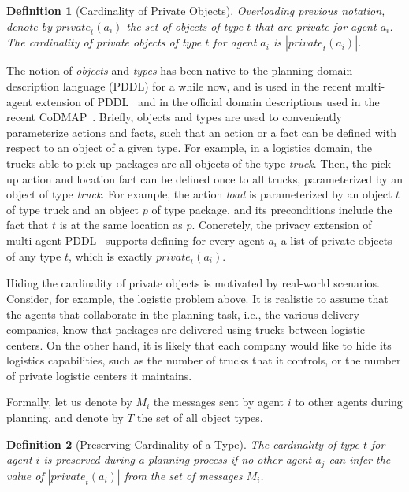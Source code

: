 \documentclass[letterpaper]{article}
\newcommand{\private}[2]{\textit{private}_{#1}(#2)}
\newtheorem{definition}{Definition}
\theoremstyle{definition}
\begin{document}
\begin{definition}[Cardinality of Private Objects]
Overloading previous notation, denote by $\private{t}{a_i}$ the set of objects of type $t$ that are private for agent $a_i$. The cardinality of private objects of type $t$ for agent $a_i$ is $|\private{t}{a_i}|$.
\end{definition}

The notion of {\em objects} and {\em types} has been native to the planning domain description language (PDDL) for a while now, and is used in the recent multi-agent extension of PDDL~\cite{kovacs2012multi} and in the official domain descriptions used in the recent CoDMAP~\cite{vstolba2015competition}. Briefly, objects and types are used to conveniently parameterize actions and facts, such that an action or a fact can be defined with respect to an object of a given type. For example, in a logistics domain, the trucks able to pick up packages are all objects of the type {\em truck}. Then, the pick up action and location fact can be defined once to all trucks, parameterized by an object of type {\em truck}. For example, the action {\em load} is parameterized by an object $t$ of type truck and an object $p$ of type package, and its preconditions include the fact that $t$ is at the same location as $p$. %
Concretely, the privacy extension of multi-agent PDDL~\cite{vstolba2015competition} supports defining for every agent $a_i$ a list of private objects of any type $t$, which is exactly $\private{t}{a_i}$.

Hiding the cardinality of private objects is motivated by real-world scenarios. Consider, for example, the logistic problem above. It is realistic to assume that the agents that collaborate in the planning task, i.e., the various delivery companies, know that packages are delivered using trucks between logistic centers. On the other hand, it is likely that each company would like to hide its logistics capabilities, such as the number of trucks that it controls, or the number of private logistic centers it maintains.

Formally, let us denote by $M_i$ the messages sent by agent $i$ to other agents during planning, and denote by $T$ the set of all object types.
\begin{definition}[Preserving Cardinality of a Type]
The cardinality of type $t$ for agent $i$ is preserved during a planning process if no other agent $a_j$ can infer the value of $|\private{t}{a_i}|$ from the set of messages $M_i$.
\end{definition}
\end{document}
